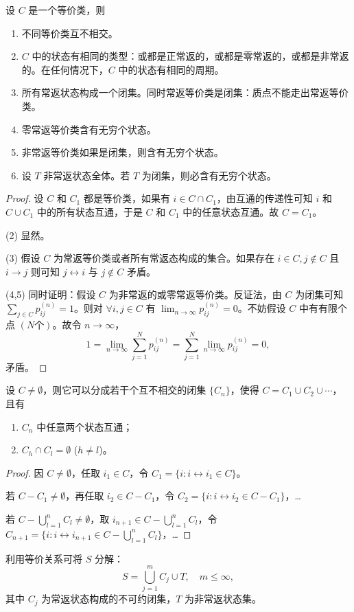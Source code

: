 \documentclass[lang=cn,10pt,thmcnt=section]{elegantbook}
\begin{document}
\begin{theorem}
	设 \( C \) 是一个等价类，则
\begin{enumerate}
    \item 不同等价类互不相交。
    \item \( C \) 中的状态有相同的类型：或都是正常返的，或都是零常返的，或都是非常返的。在任何情况下，\( C \) 中的状态有相同的周期。
    \item 所有常返状态构成一个闭集。同时常返等价类是闭集：质点不能走出常返等价类。
    \item 零常返等价类含有无穷个状态。
    \item 非常返等价类如果是闭集，则含有无穷个状态。
    \item 设 \( T \) 非常返状态全体。若 \( T \) 为闭集，则必含有无穷个状态。
\end{enumerate}
\end{theorem}

\begin{proof}
	设 \( C \) 和 \( C_1 \) 都是等价类，如果有 \( i \in C \cap C_1 \)，由互通的传递性可知 \( i \) 和 \( C \cup C_1 \) 中的所有状态互通，于是 \( C \) 和 \( C_1 \) 中的任意状态互通。故 \( C = C_1 \)。

(2) 显然。

(3) 假设 \( C \) 为常返等价类或者所有常返态构成的集合。如果存在 \( i \in C, j \notin C \) 且 \( i \rightarrow j \) 则可知 \( j \longleftrightarrow i \) 与 \( j \notin C \) 矛盾。

(4,5) 同时证明：假设 \( C \) 为非常返的或零常返等价类。反证法，由 \( C \) 为闭集可知 \( \sum_{j \in C} p_{ij}^{(n)} = 1 \)。则对 \( \forall i, j \in C \) 有 \( \lim_{n \to \infty} p_{ij}^{(n)} = 0 \)。不妨假设 \( C \) 中有有限个点 \( (N 个) \)。故令 \( n \to \infty \)，
\[
1 = \lim_{n \to \infty} \sum_{j=1}^N p_{ij}^{(n)} = \sum_{j=1}^N \lim_{n \to \infty} p_{ij}^{(n)} = 0,
\]
矛盾。
\end{proof}
\begin{theorem}
	设 \( C \neq \emptyset \)，则它可以分成若干个互不相交的闭集 \(\{C_n\}\)，使得 \( C = C_1 \cup C_2 \cup \cdots \)，且有
\begin{enumerate}
    \item \( C_n \) 中任意两个状态互通；
    \item \( C_h \cap C_l = \emptyset \) (\( h \neq l \))。
\end{enumerate}
\end{theorem}
\begin{proof}
	因 \( C \neq \emptyset \)，任取 \( i_1 \in C \)，令 \( C_1 = \{i : i \longleftrightarrow i_1 \in C\} \)。

若 \( C - C_1 \neq \emptyset \)，再任取 \( i_2 \in C - C_1 \)，令 \( C_2 = \{i : i \longleftrightarrow i_2 \in C - C_1\} \)，\ldots

若 \( C - \bigcup_{l=1}^n C_l \neq \emptyset \)，取 \( i_{n+1} \in C - \bigcup_{l=1}^n C_l \)，令 \( C_{n+1} = \{i : i \longleftrightarrow i_{n+1} \in C - \bigcup_{l=1}^n C_l\} \)，\ldots
\end{proof}
利用等价关系可将 \( S \) 分解：
\[
S = \bigcup_{j=1}^{m} C_j \cup T, \quad m \leq \infty,
\]
其中 \( C_j \) 为常返状态构成的不可约闭集，\( T \) 为非常返状态集。
\end{document}
